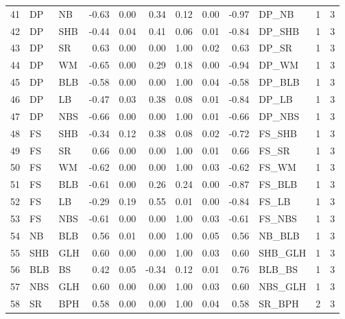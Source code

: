 \begin{table}[ht]
\begin{tabular}{rllrrrrrrlrr}
  41 & DP & NB & -0.63 & 0.00 & 0.34 & 0.12 & 0.00 & -0.97 & DP\_NB &   1 &   3 \\ 
  42 & DP & SHB & -0.44 & 0.04 & 0.41 & 0.06 & 0.01 & -0.84 & DP\_SHB &   1 &   3 \\ 
  43 & DP & SR & 0.63 & 0.00 & 0.00 & 1.00 & 0.02 & 0.63 & DP\_SR &   1 &   3 \\ 
  44 & DP & WM & -0.65 & 0.00 & 0.29 & 0.18 & 0.00 & -0.94 & DP\_WM &   1 &   3 \\ 
  45 & DP & BLB & -0.58 & 0.00 & 0.00 & 1.00 & 0.04 & -0.58 & DP\_BLB &   1 &   3 \\ 
  46 & DP & LB & -0.47 & 0.03 & 0.38 & 0.08 & 0.01 & -0.84 & DP\_LB &   1 &   3 \\ 
  47 & DP & NBS & -0.66 & 0.00 & 0.00 & 1.00 & 0.01 & -0.66 & DP\_NBS &   1 &   3 \\ 
  48 & FS & SHB & -0.34 & 0.12 & 0.38 & 0.08 & 0.02 & -0.72 & FS\_SHB &   1 &   3 \\ 
  49 & FS & SR & 0.66 & 0.00 & 0.00 & 1.00 & 0.01 & 0.66 & FS\_SR &   1 &   3 \\ 
  50 & FS & WM & -0.62 & 0.00 & 0.00 & 1.00 & 0.03 & -0.62 & FS\_WM &   1 &   3 \\ 
  51 & FS & BLB & -0.61 & 0.00 & 0.26 & 0.24 & 0.00 & -0.87 & FS\_BLB &   1 &   3 \\ 
  52 & FS & LB & -0.29 & 0.19 & 0.55 & 0.01 & 0.00 & -0.84 & FS\_LB &   1 &   3 \\ 
  53 & FS & NBS & -0.61 & 0.00 & 0.00 & 1.00 & 0.03 & -0.61 & FS\_NBS &   1 &   3 \\ 
  54 & NB & BLB & 0.56 & 0.01 & 0.00 & 1.00 & 0.05 & 0.56 & NB\_BLB &   1 &   3 \\ 
  55 & SHB & GLH & 0.60 & 0.00 & 0.00 & 1.00 & 0.03 & 0.60 & SHB\_GLH &   1 &   3 \\ 
  56 & BLB & BS & 0.42 & 0.05 & -0.34 & 0.12 & 0.01 & 0.76 & BLB\_BS &   1 &   3 \\ 
  57 & NBS & GLH & 0.60 & 0.00 & 0.00 & 1.00 & 0.03 & 0.60 & NBS\_GLH &   1 &   3 \\ 
  58 & SR & BPH & 0.58 & 0.00 & 0.00 & 1.00 & 0.04 & 0.58 & SR\_BPH &   2 &   3 \\ 
   \hline
\end{tabular}
\end{table}